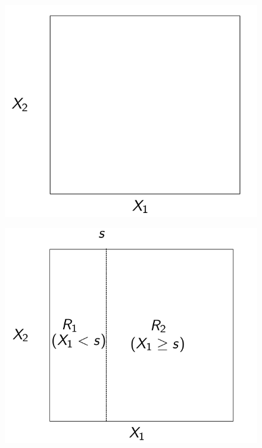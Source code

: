 \documentclass{beamer}
\theoremstyle{definition}
\begin{document}
\begin{frame}
\begin{figure}[h!]
%
\includegraphics[scale=0.3]{svg-inkscape/dibujo.png}
\end{figure}
\end{frame}

\begin{frame}
\begin{figure}[h!]
%
\includegraphics[scale=0.3]{svg-inkscape/dibujo2.png}
\end{figure}
\end{frame}
\end{document}
